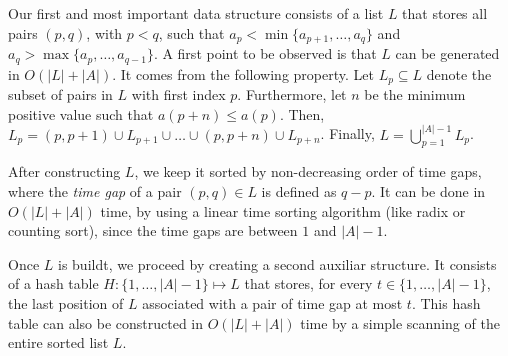 \documentclass[12pt,letterpaper]{article}
\begin{document}

Our first and most important data structure consists of a list $L$ that  stores all pairs $(p,q)$, with $p<q$,  such that
$ a_p < \min \{a_{p+1},\ldots,a_{q}\}$ and
$ a_q > \max \{a_{p},\ldots,a_{q-1}\}$.
A first point to be observed is that $L$ can be generated in $O(|L| + |A|)$.
It comes from the following property. Let $L_{p} \subseteq L$ denote the subset of pairs in $L$ with first
index $p$. Furthermore, let $n$ be the minimum positive value such that $a(p + n) \leq a(p)$.
Then, $L_{p} = (p, p + 1) \cup L_{p + 1} \cup \ldots \cup (p, p + n) \cup L_{p + n}$.
Finally, $L = \bigcup \limits_{p=1}^{|A|-1} L_{p}$.




After constructing $L$, we keep it sorted  by non-decreasing order of time gaps,
where the {\it time gap} of a pair $(p,q) \in L$ is defined as $q-p$.
It can be done in $O(|L| + |A|)$ time, by using a linear time sorting algorithm
(like radix or counting sort), since the time gaps are between $1$ and $|A|-1$.



Once $L$ is buildt, we proceed by creating a second auxiliar structure.
It consists of a hash table $H : \{1,\ldots,|A|-1\} \mapsto L$ that stores, for every $t \in \{1,\ldots,|A|-1\}$, the last position
of $L$ associated with a pair of time gap at most $t$. This hash table can also be constructed in $O(|L| + |A|)$ time by
a simple scanning of the entire sorted list $L$.


\end{document}
